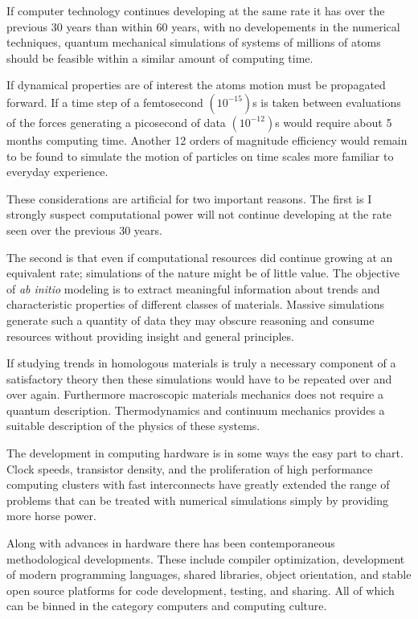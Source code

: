 If computer technology continues developing at the same rate it has
over the previous 30 years than within 60 years, with no developements in the numerical techniques, 
quantum mechanical simulations of systems of millions of atoms should be feasible
within a similar amount of computing time. 

If dynamical properties are of interest the atoms motion must be propagated forward. 
If a time step of a femtosecond $(10^{-15})$s is taken between evaluations of the 
forces generating a picosecond of data $(10^{-12})$s would require about 5 months 
computing time. Another 12 orders of magnitude efficiency would remain to be found to 
simulate the motion of particles on time scales more familiar to everyday experience.

These considerations are artificial for two important reasons. The first
is I strongly suspect computational power will not continue developing at the rate
seen over the previous 30 years. 

The second is that even if computational resources did continue growing 
at an equivalent rate; simulations of the nature might be of little value.
The objective of {\it ab initio} modeling is to extract meaningful information
about trends and characteristic properties of different classes of materials. 
Massive simulations generate such a quantity of data they may obscure 
reasoning and consume resources without providing insight and general principles.

If studying trends in homologous materials is truly a necessary component of a satisfactory
theory then these simulations would have to be repeated over and over again.
Furthermore macroscopic materials mechanics does not require a quantum description.
Thermodynamics and continuum mechanics provides a suitable description of the physics of these systems. 

The development in computing hardware is in some ways the easy part to chart. 
Clock speeds, transistor density, and the proliferation of high 
performance computing clusters with fast interconnects have greatly extended 
the range of problems that can be treated with numerical simulations
simply by providing more horse power.

Along with advances in hardware there has been contemporaneous methodological developments.
These include compiler optimization, development of modern programming languages, 
shared libraries, object orientation, and stable open source platforms for 
code development, testing, and sharing. All of which can be binned in the 
category computers and computing culture.

